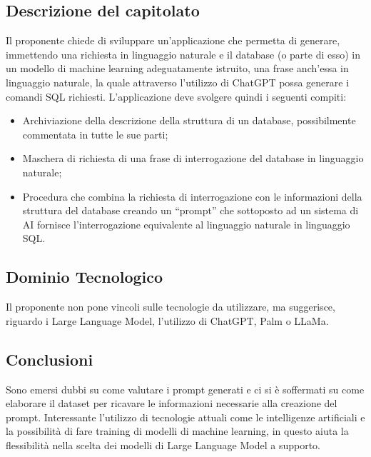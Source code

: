\documentclass[a4paper, twoside]{article}
\begin{document}
    \subsection{Descrizione del capitolato}
        Il proponente chiede di sviluppare un'applicazione che permetta di generare, immettendo una richiesta in linguaggio naturale e il database (o parte di esso) in un modello di machine learning adeguatamente istruito, una frase anch'essa in linguaggio naturale, la quale attraverso l'utilizzo di ChatGPT possa generare i comandi SQL richiesti.
        L'applicazione deve svolgere quindi i seguenti compiti:
        \begin{itemize}
            \item  Archiviazione della descrizione della struttura di un database, possibilmente commentata in
            tutte le sue parti;
            \item  Maschera di richiesta di una frase di interrogazione del database in linguaggio naturale;
            \item  Procedura che combina la richiesta di interrogazione con le informazioni della struttura del
            database creando un “prompt” che sottoposto ad un sistema di AI fornisce l’interrogazione
            equivalente al linguaggio naturale in linguaggio SQL.
        \end{itemize}

    \subsection{Dominio Tecnologico}
    Il proponente non pone vincoli sulle tecnologie da utilizzare, ma suggerisce, riguardo i Large Language Model, l'utilizzo di ChatGPT, Palm o LLaMa.

    \subsection{Conclusioni}
        Sono emersi dubbi su come valutare i prompt generati e ci si è soffermati su come elaborare il dataset per ricavare le informazioni necessarie alla creazione del prompt.
        Interessante l'utilizzo di tecnologie attuali come le intelligenze artificiali e la possibilità di fare training di modelli di machine learning, in questo aiuta la flessibilità nella scelta dei modelli di Large Language Model a supporto.
\end{document}
